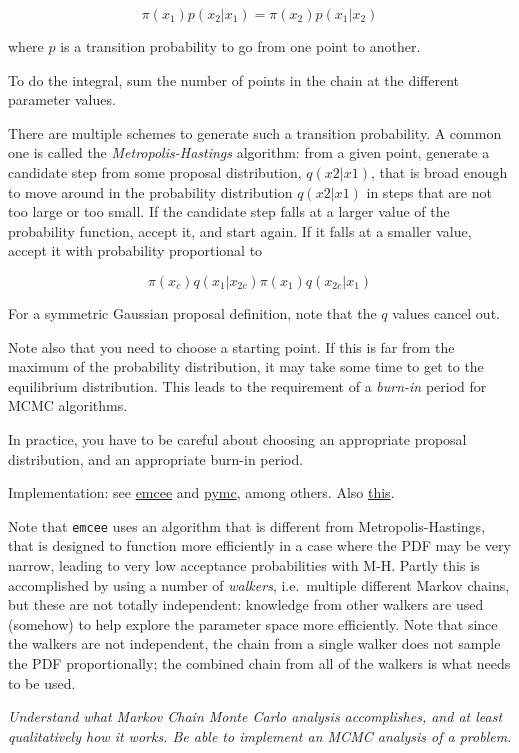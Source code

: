 \documentclass{article}
\newcommand{\test}[1]{%
    \begin{center}
        \colorbox{hl}{\parbox{0.9\textwidth}{\emph{#1}}}
    \end{center}}
\begin{document}
$$ \pi(x_{1})p(x_{2}|x_{1}) = \pi(x_{2})p(x_{1}|x_{2})  $$

where $p$ is a transition probability to go from one point to another.

To do the integral, sum the number of points in the chain at the different
parameter values.

There are multiple schemes to generate such a transition probability.  A common
one is called the \emph{Metropolis-Hastings} algorithm: from a given point,
generate a candidate step from some proposal distribution, $q(x2|x1)$, that is
broad enough to move around in the probability distribution $q(x2|x1)$ in steps
that are not too large or too small. If the candidate step falls at a larger
value of the probability function, accept it, and start again. If it falls at a
smaller value, accept it with probability proportional to

$$ \pi(x_c)q(x_1|x_{2c}) \pi(x_1)q(x_{2c}|x_1)  $$

For a symmetric Gaussian proposal definition, note that the $q$ values
cancel out.

Note also that you need to choose a starting point. If this is far from the
maximum of the probability distribution, it may take some time to get to the
equilibrium distribution. This leads to the requirement of a \emph{burn-in}
period for MCMC algorithms.

In practice, you have to be careful about choosing an appropriate
proposal distribution, and an appropriate burn-in period.

Implementation: see \href{http://dan.iel.fm/emcee/current/}
{emcee} and \href{https://pymc-devs.github.io/pymc/}
{pymc}, among others. Also
\href{http://jakevdp.github.io/blog/2014/06/14/frequentism-and-bayesianism-4-bayesian-in-python/}
{this}.

Note that {\tt emcee} uses an algorithm that is different from
Metropolis-Hastings, that is designed to function more efficiently in a case
where the PDF may be very narrow, leading to very low acceptance probabilities
with M-H. Partly this is accomplished by using a number of \emph{walkers},
i.e.\ multiple different Markov chains, but these are not totally independent:
knowledge from other walkers are used (somehow) to help explore the parameter
space more efficiently. Note that since the walkers are not independent, the
chain from a single walker does not sample the PDF proportionally; the combined
chain from all of the walkers is what needs to be used.

\test{Understand what Markov Chain Monte Carlo analysis accomplishes, and at
least qualitatively how it works. Be able to implement an MCMC analysis of
a problem.}
\end{document}
